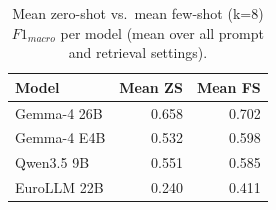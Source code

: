 \begin{table}[t]
\centering
\caption{Mean zero-shot vs.\ mean few-shot (k=8) $F1_{macro}$ per model (mean over all prompt and retrieval settings).}\label{tab:a2-model-shot}
\small
\begin{tabular}{lrr}
\toprule
Model & Mean ZS & Mean FS\\
\midrule
Gemma-4 26B & 0.658 & 0.702 \\
Gemma-4 E4B & 0.532 & 0.598 \\
Qwen3.5 9B & 0.551 & 0.585 \\
EuroLLM 22B & 0.240 & 0.411 \\
\bottomrule
\end{tabular}
\end{table}